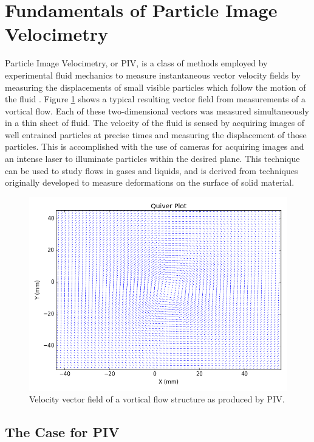 \section{Fundamentals of Particle Image Velocimetry}

Particle Image Velocimetry, or PIV, is a class of methods employed by 
experimental fluid mechanics to measure instantaneous vector velocity fields by 
measuring the displacements of small visible particles which follow the motion 
of the fluid \cite{adrian2011}. Figure \ref{fig:quiver_example} shows a typical 
resulting vector field from measurements of a vortical flow. Each of these 
two-dimensional vectors was measured simultaneously in a thin sheet of fluid. 
The velocity of the fluid is sensed by acquiring images of well entrained 
particles at precise times and measuring the displacement of those particles. 
This is accomplished with the use of cameras for acquiring images and an 
intense laser to illuminate particles within the desired plane. 
This technique can be used to study flows in gases and liquids, and is derived 
from techniques originally developed to measure deformations on the surface of 
solid material.

\begin{figure}[H]
	\centering
	\includegraphics[width=5in]{figs/example_vortex_figs/example_quiver}
	\caption{Velocity vector field of a vortical flow structure as produced by 
	PIV.}
	\label{fig:quiver_example}
\end{figure}

 
\subsection{The Case for PIV}

